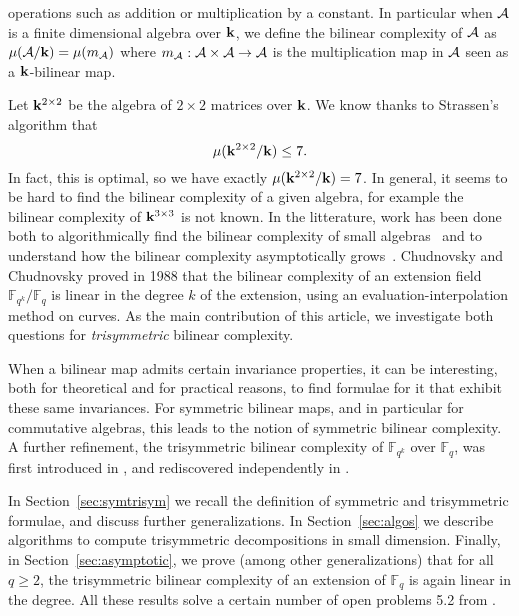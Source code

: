 \documentclass[11pt]{article}
\begin{document}
operations such as addition or multiplication by a constant.
In particular when $\mathcal{A}$ is a finite dimensional algebra over $\mathbf{k}$,
we define the bilinear complexity of $\mathcal{A}$ as $\mu(\mathcal{A}/\mathbf{k})=\mu(m_{\mathcal{A}})$
where $m_{\mathcal{A}}:\mathcal{A}\times\mathcal{A}\to\mathcal{A}$ is the multiplication map in $\mathcal{A}$ seen
as a $\mathbf{k}$-bilinear map. 

Let $\mathbf{k}^{2\times2}$ be the algebra
of $2\times2$ matrices over $\mathbf{k}$. We know thanks to Strassen's algorithm that 
\[
  \mu(\mathbf{k}^{2\times 2}/\mathbf{k}) \leq 7.
\]
In fact, this is optimal, so we have exactly $\mu(\mathbf{k}^{2\times2}/\mathbf{k})=7$. In
general, it seems to be hard to find the bilinear complexity of a given algebra,
for example the bilinear complexity of $\mathbf{k}^{3\times3}$ is not known.
In the litterature, work has been done both to algorithmically find the bilinear complexity of
small algebras~\cite{BDEZ12, Covanov19} and to understand how the bilinear
complexity asymptotically grows~\cite{CC88, BCPRRR19}. Chudnovsky and Chudnovsky
proved in 1988 that the bilinear complexity of an extension field
$\mathbb{F}_{q^k}/\mathbb{F}_{q}$ is linear in the degree $k$ of the
extension, using an evaluation-interpolation method on curves.
As the main contribution of this article, we
investigate both questions for \emph{trisymmetric} bilinear complexity.

When a bilinear map admits certain invariance properties, it can be interesting,
both for theoretical and for practical reasons,
to find formulae for it that exhibit these same invariances.
For symmetric bilinear maps, and in particular for commutative algebras, this leads to the notion of symmetric bilinear complexity.
A further refinement, the trisymmetric bilinear complexity of $\mathbb{F}_{q^k}$ over $\mathbb{F}_{q}$, was first introduced in \cite{SL84}, and rediscovered independently in \cite[App.~A]{Randriam15}.

In Section~\ref{sec:symtrisym} we recall the definition of symmetric and trisymmetric formulae, and discuss further generalizations. In Section~\ref{sec:algos} we
describe algorithms to compute trisymmetric decompositions in small dimension.
Finally, in
Section~\ref{sec:asymptotic}, we prove (among other generalizations) that for all $q\geq2$, the trisymmetric bilinear
complexity of an extension of $\mathbb{F}_q$ is again linear in the degree.
All these results solve a certain number of open problems 5.2 from \cite{BCPRRR19}.
\end{document}
